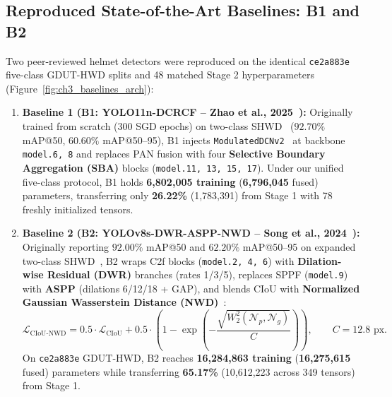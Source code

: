 \subsection{Reproduced State-of-the-Art Baselines: B1 and B2}

Two peer-reviewed helmet detectors were reproduced on the identical \texttt{ce2a883e} five-class GDUT-HWD splits and 48 matched Stage 2 hyperparameters (Figure~\ref{fig:ch3_baselines_arch}):
\begin{enumerate}[leftmargin=1.8em, itemsep=2.5pt]
  \item \textbf{Baseline 1 (B1: YOLO11n-DCRCF -- Zhao et al., 2025~\cite{zhao2025yolodcrcf}):} Originally trained from scratch (300 SGD epochs) on two-class SHWD~\cite{shwd_dataset} ($92.70\%$ mAP@50, $60.60\%$ mAP@50--95), B1 injects \texttt{ModulatedDCNv2}~\cite{zhu2019deformable} at backbone \texttt{model.6, 8} and replaces PAN fusion with four \textbf{Selective Boundary Aggregation (SBA)} blocks (\texttt{model.11, 13, 15, 17}). Under our unified five-class protocol, B1 holds \textbf{6,802,005 training} (\textbf{6,796,045} fused) parameters, transferring only \textbf{26.22\%} (1,783,391) from Stage 1 with 78 freshly initialized tensors.
  \item \textbf{Baseline 2 (B2: YOLOv8s-DWR-ASPP-NWD -- Song et al., 2024~\cite{song2024improved}):} Originally reporting $92.00\%$ mAP@50 and $62.20\%$ mAP@50--95 on expanded two-class SHWD~\cite{shwd_dataset}, B2 wraps C2f blocks (\texttt{model.2, 4, 6}) with \textbf{Dilation-wise Residual (DWR)} branches (rates 1/3/5), replaces SPPF (\texttt{model.9}) with \textbf{ASPP} (dilations 6/12/18 + GAP), and blends CIoU with \textbf{Normalized Gaussian Wasserstein Distance (NWD)}~\cite{wang2021nwd}:
  \begin{equation}
  \mathcal{L}_{\text{CIoU-NWD}} = 0.5 \cdot \mathcal{L}_{\text{CIoU}} + 0.5 \cdot \left(1 - \exp\!\left(-\frac{\sqrt{W_2^2(\mathcal{N}_p, \mathcal{N}_g)}}{C}\right)\right), \qquad C = 12.8\text{ px}.
  \label{eq:sota_nwd}
  \end{equation}
  On \texttt{ce2a883e} GDUT-HWD, B2 reaches \textbf{16,284,863 training} (\textbf{16,275,615} fused) parameters while transferring \textbf{65.17\%} (10,612,223 across 349 tensors) from Stage 1.
\end{enumerate}

